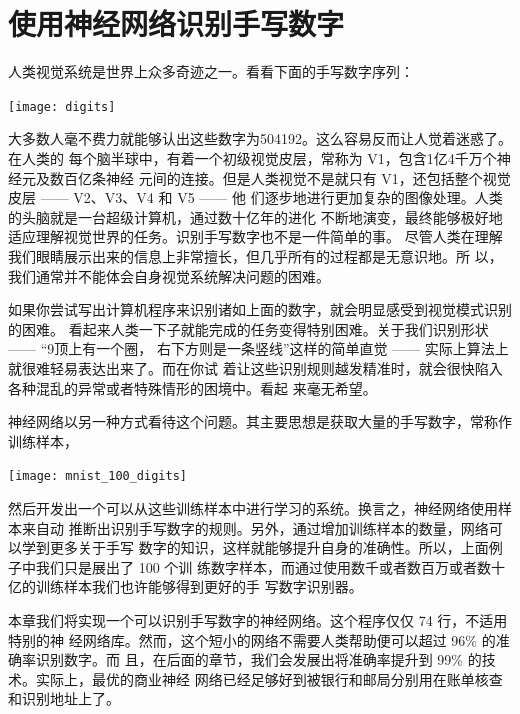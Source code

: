 
\chapter{使用神经网络识别手写数字}
\label{ch:UsingNeuralNetsToRecognizeHandwrittenDigits}

人类视觉系统是世界上众多奇迹之一。看看下面的手写数字序列：
\begin{center}
  \texttt{[image: digits]}\label{fig:digits}
\end{center}

大多数人毫不费力就能够认出这些数字为504192。这么容易反而让人觉着迷惑了。在人类的
每个脑半球中，有着一个初级视觉皮层，常称为 {\serif V1}，包含1亿4千万个神经元及数百亿条神经
元间的连接。但是人类视觉不是就只有 {\serif V1}，还包括整个视觉皮层 —— {\serif V2}、{\serif V3}、{\serif V4} 和 {\serif V5} —— 他
们逐步地进行更加复杂的图像处理。人类的头脑就是一台超级计算机，通过数十亿年的进化
不断地演变，最终能够极好地适应理解视觉世界的任务。识别手写数字也不是一件简单的事。
尽管人类在理解我们眼睛展示出来的信息上非常擅长，但几乎所有的过程都是无意识地。所
以，我们通常并不能体会自身视觉系统解决问题的困难。

如果你尝试写出计算机程序来识别诸如上面的数字，就会明显感受到视觉模式识别的困难。
看起来人类一下子就能完成的任务变得特别困难。关于我们识别形状 —— “9顶上有一个圈，
右下方则是一条竖线”这样的简单直觉 —— 实际上算法上就很难轻易表达出来了。而在你试
着让这些识别规则越发精准时，就会很快陷入各种混乱的异常或者特殊情形的困境中。看起
来毫无希望。

神经网络以另一种方式看待这个问题。其主要思想是获取大量的手写数字，常称作训练样本，
\begin{center}
  \texttt{[image: mnist\_100\_digits]}
\end{center}

然后开发出一个可以从这些训练样本中进行学习的系统。换言之，神经网络使用样本来自动
推断出识别手写数字的规则。另外，通过增加训练样本的数量，网络可以学到更多关于手写
数字的知识，这样就能够提升自身的准确性。所以，上面例子中我们只是展出了 100 个训
练数字样本，而通过使用数千或者数百万或者数十亿的训练样本我们也许能够得到更好的手
写数字识别器。

本章我们将实现一个可以识别手写数字的神经网络。这个程序仅仅 74 行，不适用特别的神
经网络库。然而，这个短小的网络不需要人类帮助便可以超过 96\% 的准确率识别数字。而
且，在后面的章节，我们会发展出将准确率提升到 99\% 的技术。实际上，最优的商业神经
网络已经足够好到被银行和邮局分别用在账单核查和识别地址上了。

